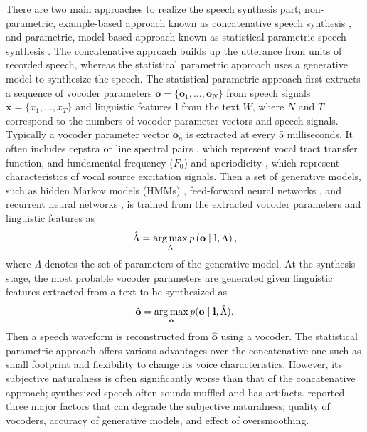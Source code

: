 \documentclass{article}
\renewcommand{\vec}{\mathbf}
\def\bo{\vec{o}}
\def\bl{\vec{l}}
\def\bx{\vec{x}}
\newcommand{\argmax}{\operatornamewithlimits{\mathrm{arg\,max}}}
\begin{document}
There are two main approaches to realize the speech synthesis part; non-parametric, example-based approach known as concatenative speech synthesis \citep{PSOLA,ATR_nutalk,Hunt_UnitSelection_ICASSP}, and parametric, model-based approach known as statistical parametric speech synthesis \citep{yoshimura_PhD,Zen_SPSS_SPECOM}.
The concatenative approach builds up the utterance from units of recorded speech, whereas the statistical parametric approach uses a generative model to synthesize the speech.
The statistical parametric approach first extracts a sequence of vocoder parameters \citep{Vocoder} $\bo = \{ \bo_1, \dots, \bo_N \}$ from speech signals $\bx = \{ x_1, \dots, x_T \}$ and linguistic features $\bl$ from the text $W$, where $N$ and $T$ correspond to the numbers of vocoder parameter vectors and speech signals.
Typically a vocoder parameter vector $\bo_n$ is extracted at every 5 milliseconds.
It often includes cepstra \citep{UELS} or line spectral pairs \citep{LSP}, which represent 
vocal tract transfer function, and fundamental
frequency ($F_0$) and aperiodicity \citep{Kawahara_STRAIGHT_Excitation}, which represent characteristics of vocal source excitation signals.
Then a set of generative models, such as hidden Markov models (HMMs) \citep{yoshimura_PhD}, feed-forward neural networks \citep{Zen_DNN_ICASSP}, and recurrent neural networks \citep{Robinson_RNNTTS,Karaani_RTDNNTTS,Fan_BLSTM_Interspeech14}, is trained from the extracted vocoder parameters and linguistic features as
\begin{equation}
  \hat{\Lambda} = \argmax_{\Lambda} p\left( \bo \mid \bl, \Lambda \right),
\end{equation}
where $\Lambda$ denotes the set of parameters of the generative model.
At the synthesis stage, the most probable vocoder parameters are generated given linguistic features extracted from a text to be synthesized as
\begin{equation}
  \hat{\bo} = \argmax_{\bo} p ( \bo \mid \bl, \hat{\Lambda} ).
\end{equation}
Then a speech waveform is reconstructed from $\hat{\bo}$ using a vocoder.
The statistical parametric approach offers various advantages over the
concatenative one such as small footprint
and flexibility to change its voice characteristics.
However, its subjective naturalness is often significantly worse than that of the concatenative approach; synthesized speech often sounds muffled and has artifacts.
\cite{Zen_SPSS_SPECOM} reported three major factors that can degrade the subjective naturalness; quality of vocoders, accuracy of generative models, and effect of oversmoothing.
\end{document}

